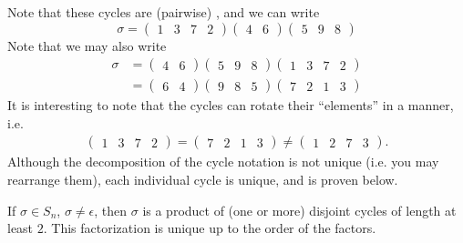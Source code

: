 Note that these cycles are (pairwise) , and we can write
\begin{equation*}
  \sigma = \begin{pmatrix} 1 & 3 & 7 & 2 \end{pmatrix}\begin{pmatrix} 4 & 6 \end{pmatrix}\begin{pmatrix} 5 & 9 & 8 \end{pmatrix}
\end{equation*}
Note that we may also write
\begin{align*}
  \sigma &= \begin{pmatrix} 4 & 6 \end{pmatrix}\begin{pmatrix} 5 & 9 & 8 \end{pmatrix}\begin{pmatrix} 1 & 3 & 7 & 2 \end{pmatrix} \\
    &= \begin{pmatrix} 6 & 4 \end{pmatrix}\begin{pmatrix} 9 & 8 & 5 \end{pmatrix}\begin{pmatrix} 7 & 2 & 1 & 3 \end{pmatrix}
\end{align*}
It is interesting to note that the cycles can rotate their ``elements'' in a  manner, i.e.
\begin{gather*}
  \begin{pmatrix} 1 & 3 & 7 & 2 \end{pmatrix} = \begin{pmatrix} 7 & 2 & 1 & 3 \end{pmatrix} \neq \begin{pmatrix} 1 & 2 & 7 & 3 \end{pmatrix}.
\end{gather*}
Although the decomposition of the cycle notation is not unique (i.e. you may rearrange them), each individual cycle is unique, and is proven below.

\begin{thm}\label{thm:cycle_decomposition_theorem}
  If $\sigma \in S_n$, $\sigma \neq \epsilon$, then $\sigma$ is a product of (one or more) disjoint cycles of length at least $2$. This factorization is unique up to the order of the factors.
\end{thm}

